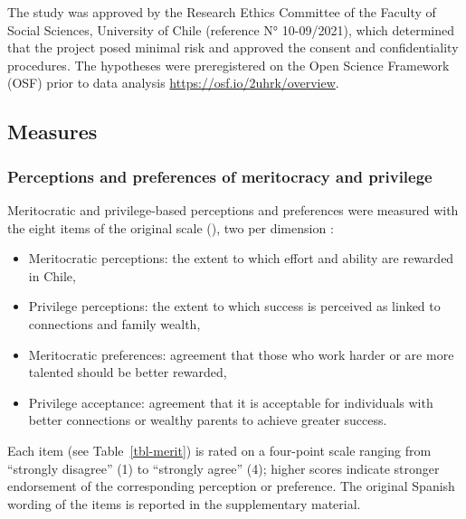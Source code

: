 \documentclass[
  11pt,
]{article}
\begin{document}
The study was approved by the Research Ethics Committee of the Faculty
of Social Sciences, University of Chile (reference N° 10-09/2021), which
determined that the project posed minimal risk and approved the consent
and confidentiality procedures. The hypotheses were preregistered on the
Open Science Framework (OSF) prior to data analysis
\url{https://osf.io/2uhrk/overview}.

\subsection{Measures}\label{measures}

\subsubsection{Perceptions and preferences of meritocracy and
privilege}\label{perceptions-and-preferences-of-meritocracy-and-privilege}

Meritocratic and privilege-based perceptions and preferences were
measured with the eight items of the original scale
(),
two per dimension :

\begin{itemize}
\item
  Meritocratic perceptions: the extent to which effort and ability are
  rewarded in Chile,
\item
  Privilege perceptions: the extent to which success is perceived as
  linked to connections and family wealth,
\item
  Meritocratic preferences: agreement that those who work harder or are
  more talented should be better rewarded,
\item
  Privilege acceptance: agreement that it is acceptable for individuals
  with better connections or wealthy parents to achieve greater success.
\end{itemize}

Each item (see Table~\ref{tbl-merit}) is rated on a four-point scale
ranging from ``strongly disagree'' (1) to ``strongly agree'' (4); higher
scores indicate stronger endorsement of the corresponding perception or
preference. The original Spanish wording of the items is reported in the
supplementary material.
\end{document}
